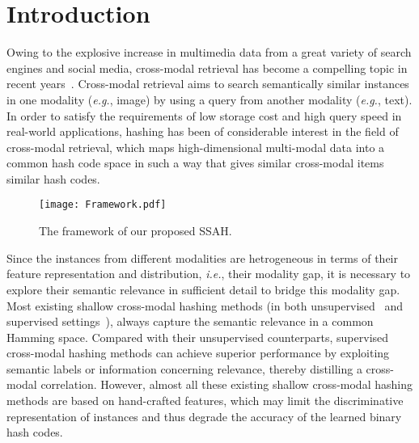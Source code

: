 \documentclass[10pt,twocolumn,letterpaper]{article}
\begin{document}
\section{Introduction}
\vspace{-0.15cm}
Owing to the explosive increase in multimedia data from a great variety of search engines and social media, cross-modal retrieval has become a compelling topic in recent years~\cite{liu2011hashing, liu2016query, liu2016structure, liu2016queryhash, liu2017distributed,Mandal2017CVPR, shen2015learning, sun2013survey, Wan2014Deep, Wu2017CVPR, xu2013survey, Zhang2016CVPR}. Cross-modal retrieval aims to search semantically similar instances in one modality (\emph{e.g.}, image) by using a query from another modality (\emph{e.g.}, text). In order to satisfy the requirements of low storage cost and high query speed in real-world applications, hashing has been of considerable interest in the field of cross-modal retrieval, which maps high-dimensional multi-modal data into a common hash code space in such a way that gives similar cross-modal items similar hash codes.
\begin{figure*}[!t]
	\begin{center}
		\texttt{[image: Framework.pdf]}
	\end{center}
	\vspace{-0.6cm}
	\caption{The framework of our proposed SSAH.}
	\label{fig:SSAH framework}
	\vspace{-0.5cm}
\end{figure*}
Since the instances from different modalities are hetrogeneous in terms of their feature representation and distribution, \emph{i.e.}, their modality gap, it is necessary to explore their semantic relevance in sufficient detail to bridge this modality gap. Most existing shallow cross-modal hashing methods (in both unsupervised~\cite{Bronstein2010Data, Feng2014Cross, Kumar2011Learning, liu2014discrete} and supervised settings~\cite{deng2016discriminative, Liu2017CVPR, liu2012supervised, Masci2014Multimodal, shen2015supervised, Wu2014Sparse, song2015top}), always capture the semantic relevance in a common Hamming space. Compared with  their unsupervised counterparts, supervised cross-modal hashing methods can achieve superior performance by exploiting semantic labels or information concerning relevance, thereby distilling a cross-modal correlation. However, almost all these existing shallow cross-modal hashing methods are based on hand-crafted features, which may limit the discriminative representation of instances and thus degrade the accuracy of the learned binary hash codes.
\end{document}
